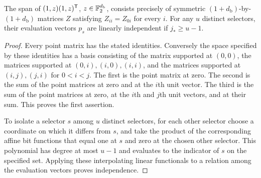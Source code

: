 \begin{lemma}\label{lem:base-moments}
The span of $(1,z)(1,z)^{\mathsf T}$, $z\in\mathbb F_2^{d_{\mathrm b}}$, consists precisely of
symmetric $(1+d_{\mathrm b})$-by-$(1+d_{\mathrm b})$ matrices $Z$ satisfying
$Z_{ii}=Z_{0i}$ for every $i$.
For any $u$ distinct selectors, their evaluation vectors $p_s$ are
linearly independent if $j_*\ge u-1$.
\end{lemma}
\begin{proof}
Every point matrix has the stated identities.  Conversely the space
specified by these identities has a basis consisting of the matrix
supported at $(0,0)$, the matrices supported at
$(0,i),(i,0),(i,i)$, and the matrices supported at $(i,j),(j,i)$ for
$0<i<j$.  The first is the point matrix at zero.  The second is the
sum of the point matrices at zero and at the $i$th unit vector.  The
third is the sum of the point matrices at zero, at the $i$th and $j$th
unit vectors, and at their sum.  This proves the first assertion.

To isolate a selector $s$ among $u$ distinct selectors, for each other
selector choose a coordinate on which it differs from $s$, and take
the product of the corresponding affine bit functions that equal one
at $s$ and zero at the chosen other selector.  This polynomial has
degree at most $u-1$ and evaluates to the indicator of $s$ on the
specified set.  Applying these interpolating linear functionals to a
relation among the evaluation vectors proves independence.
\end{proof}

